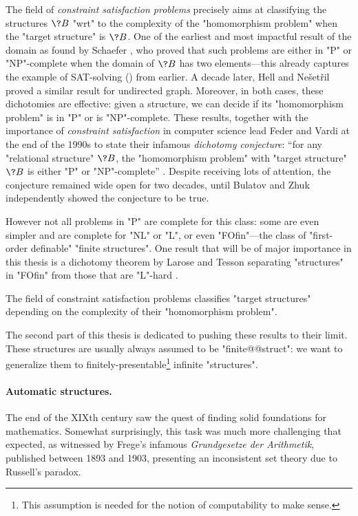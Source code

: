 The field of \emph{constraint satisfaction problems} precisely aims at classifying the
structures $\?B$ "wrt" to the complexity of the "homomorphism problem" when the
"target structure" is $\?B$. One of the earliest and most impactful result
of the domain as found by Schaefer \cite{Schaefer1978ComplexitySatisfiability},
who proved that such problems are either in "P" or "NP"-complete when the domain of $\?B$
has two elements---this already captures the example of SAT-solving () from earlier.
A decade later, Hell and Ne\v{s}et\v{r}il \cite{HellNesetril1990ComplexityColoring}
proved a similar result for undirected graph.
Moreover, in both cases, these dichotomies are effective: given a structure, we can decide if
its "homomorphism problem" is in "P" or is "NP"-complete.
These results, together with the importance of \emph{constraint satisfaction} in computer science
lead Feder and Vardi at the end of the 1990s
to state their infamous \emph{dichotomy conjecture}: ``for any "relational structure" $\?B$,
the "homomorphism problem" with "target structure" $\?B$ is either "P"
or "NP"-complete'' \cite{FederVardi1998ComputationalStructure}.
Despite receiving lots of attention, the conjecture remained wide open for two decades, until
Bulatov \cite{Bulatov2017DichotomyCSPs} and Zhuk \cite{Zhuk2020CSPDichotomy} independently
showed the conjecture to be true.

However not all problems in "P" are complete for this class: some are even simpler and are complete
for "NL" or "L", or even "FOfin"---the class of "first-order definable" "finite structures".
One result that will be of major importance in this thesis is a dichotomy
theorem by Larose and Tesson separating "structures" in "FOfin" from those that are "L"-hard
\cite{LaroseTesson2009UniversalAlgebraCSP}.

\begin{known}
	The field of constraint satisfaction problems classifies "target structures"
	depending on the complexity of their "homomorphism problem".
\end{known}

The second part of this thesis is dedicated to pushing these results to their limit.
These structures are usually always assumed to be "finite@@struct": we want to generalize them
to finitely-presentable\footnote{This assumption is needed for the notion
of computability to make sense.} infinite "structures".

\paragraph*{Automatic structures.}
The end of the XIXth century saw the quest of finding solid foundations
for mathematics. Somewhat surprisingly, this task was much more challenging that expected,
as witnessed by Frege's infamous \emph{Grundgesetze der Arithmetik},
published between 1893 and 1903, presenting an inconsistent set theory due to Russell's paradox.

